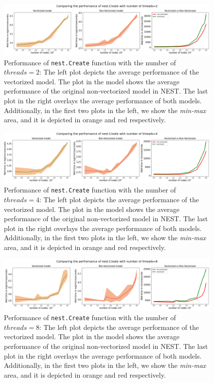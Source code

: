 \begin{figure}[ht!]
    \centering
    \includegraphics[width=\textwidth]{src/pic/thread_2.png}
    \caption{Performance of \texttt{nest.Create} function with the number of $threads=2$: The left plot depicts the average performance of the vectorized model. The plot in the model shows the average performance of the original non-vectorized model in NEST. The last plot in the right overlays the average performance of both models. Additionally, in the first two plots in the left, we show the \emph{min-max} area, and it is depicted in orange and red respectively.}
    \label{fig:threads_2}
\end{figure}

\begin{figure}[ht!]
    \centering
    \includegraphics[width=\textwidth]{src/pic/thread_4.png}
    \caption{Performance of \texttt{nest.Create} function with the number of $threads=4$: The left plot depicts the average performance of the vectorized model. The plot in the model shows the average performance of the original non-vectorized model in NEST. The last plot in the right overlays the average performance of both models. Additionally, in the first two plots in the left, we show the \emph{min-max} area, and it is depicted in orange and red respectively.}
    \label{fig:threads_4}
\end{figure}

\begin{figure}[ht!]
    \centering
    \includegraphics[width=\textwidth]{src/pic/thread_8.png}
    \caption{Performance of \texttt{nest.Create} function with the number of $threads=8$: The left plot depicts the average performance of the vectorized model. The plot in the model shows the average performance of the original non-vectorized model in NEST. The last plot in the right overlays the average performance of both models. Additionally, in the first two plots in the left, we show the \emph{min-max} area, and it is depicted in orange and red respectively.}
    \label{fig:threads_8}
\end{figure}


